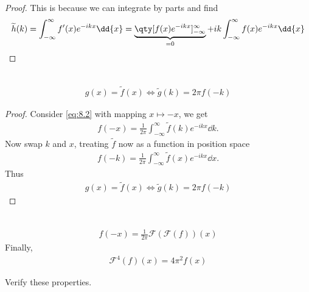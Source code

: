 \begin{proof}
	This is because we can integrate by parts and find
	\begin{align*}
		\widetilde h(k) = \int_{-\infty}^\infty f'(x) e^{-ikx} \dd{x} = \underbrace{\qty[f(x) e^{-ikx}]_{-\infty}^\infty}_{=0} + ik\int_{-\infty}^\infty f(x) e^{-ikx} \dd{x}
	\end{align*}
\end{proof} 

\begin{proposition} ~\vspace*{-1.5\baselineskip}
	\begin{align} \label{eq:8.14}
		g(x) = \widetilde{f}(x) \iff \widetilde{g}(k) = 2 \pi f(-k)
	\end{align} 
\end{proposition} 

\begin{proof}
	Consider \cref{eq:8.2} with mapping $x \mapsto -x$, we get
	\begin{align*}
		f(-x) = \frac{1}{2\pi} \int_{-\infty}^\infty \widetilde f(k) e^{-ikx} \dd{k}.
	\end{align*}
	Now swap $k$ and $x$, treating $\widetilde f$ now as a function in position space
	\begin{align*}
		f(-k) = \frac{1}{2\pi} \int_{-\infty}^\infty \widetilde f(x) e^{-ikx} \dd{x}.
	\end{align*}
	Thus
	\begin{align*}
		g(x) = \widetilde f(x) \iff \widetilde g(k) = 2\pi f(-k)
	\end{align*}
\end{proof} 

\begin{corollary} ~\vspace*{-1.5\baselineskip}
	\begin{align*}
		f(-x) = \frac{1}{2\pi} \mathcal F(\mathcal F(f))(x)
	\end{align*}
	Finally,
	\begin{align*}
		\mathcal F^4(f)(x) = 4\pi^2 f(x)
	\end{align*}
\end{corollary} 

\begin{exercise}
	Verify these properties.
\end{exercise} 


